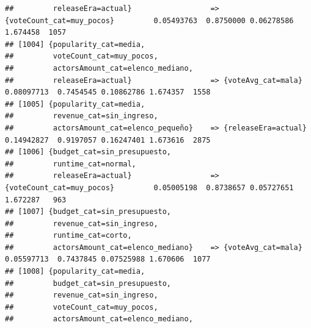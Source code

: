 \documentclass[
]{article}
\begin{document}
\begin{verbatim}
##         releaseEra=actual}                  => {voteCount_cat=muy_pocos}         0.05493763  0.8750000 0.06278586 1.674458  1057
## [1004] {popularity_cat=media,                                                                                                   
##         voteCount_cat=muy_pocos,                                                                                                
##         actorsAmount_cat=elenco_mediano,                                                                                        
##         releaseEra=actual}                  => {voteAvg_cat=mala}                0.08097713  0.7454545 0.10862786 1.674357  1558
## [1005] {popularity_cat=media,                                                                                                   
##         revenue_cat=sin_ingreso,                                                                                                
##         actorsAmount_cat=elenco_pequeño}    => {releaseEra=actual}               0.14942827  0.9197057 0.16247401 1.673616  2875
## [1006] {budget_cat=sin_presupuesto,                                                                                             
##         runtime_cat=normal,                                                                                                     
##         releaseEra=actual}                  => {voteCount_cat=muy_pocos}         0.05005198  0.8738657 0.05727651 1.672287   963
## [1007] {budget_cat=sin_presupuesto,                                                                                             
##         revenue_cat=sin_ingreso,                                                                                                
##         runtime_cat=corto,                                                                                                      
##         actorsAmount_cat=elenco_mediano}    => {voteAvg_cat=mala}                0.05597713  0.7437845 0.07525988 1.670606  1077
## [1008] {popularity_cat=media,                                                                                                   
##         budget_cat=sin_presupuesto,                                                                                             
##         revenue_cat=sin_ingreso,                                                                                                
##         voteCount_cat=muy_pocos,                                                                                                
##         actorsAmount_cat=elenco_mediano,                                                                                        

\end{verbatim}
\end{document}
